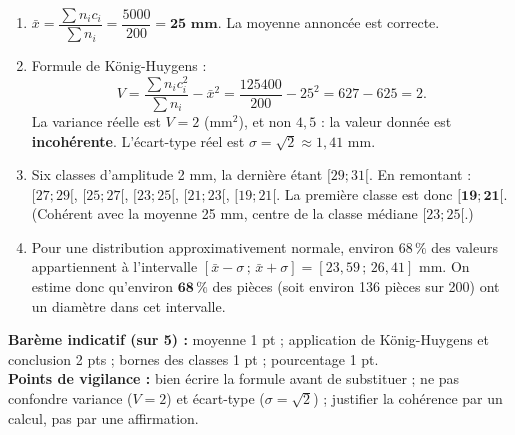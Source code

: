 \documentclass[11pt]{article}
\begin{document}
\begin{corrige}
\begin{enumerate}
    \item $\bar{x} = \dfrac{\sum n_i c_i}{\sum n_i} = \dfrac{5000}{200} = \mathbf{25 \text{ mm}}$. La moyenne annoncée est correcte.
    \item Formule de König-Huygens :
    \[ V = \frac{\sum n_i c_i^2}{\sum n_i} - \bar{x}^2 = \frac{125400}{200} - 25^2 = 627 - 625 = 2. \]
    La variance réelle est $V = 2$ (mm$^2$), et non $4{,}5$ : la valeur donnée est \textbf{incohérente}. L'écart-type réel est $\sigma = \sqrt{2} \approx 1{,}41$ mm.
    \item Six classes d'amplitude 2 mm, la dernière étant $[29;31[$. En remontant : $[27;29[$, $[25;27[$, $[23;25[$, $[21;23[$, $[19;21[$. La première classe est donc $\mathbf{[19;21[}$. (Cohérent avec la moyenne 25 mm, centre de la classe médiane $[23;25[$.)
    \item Pour une distribution approximativement normale, environ $68\,\%$ des valeurs appartiennent à l'intervalle $[\bar{x}-\sigma\,;\,\bar{x}+\sigma] = [23{,}59\,;\,26{,}41]$ mm. On estime donc qu'environ $\mathbf{68\,\%}$ des pièces (soit environ 136 pièces sur 200) ont un diamètre dans cet intervalle.
\end{enumerate}
\textbf{Barème indicatif (sur 5) :} moyenne 1 pt ; application de König-Huygens et conclusion 2 pts ; bornes des classes 1 pt ; pourcentage 1 pt.\\
\textbf{Points de vigilance :} bien écrire la formule avant de substituer ; ne pas confondre variance ($V = 2$) et écart-type ($\sigma = \sqrt{2}$) ; justifier la cohérence par un calcul, pas par une affirmation.
\end{corrige}
\end{document}
